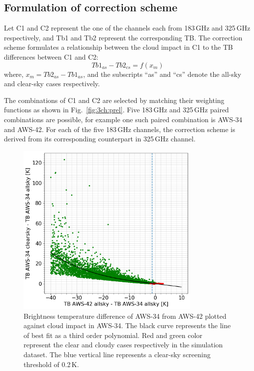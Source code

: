 \documentclass[12pt]{article}
\begin{document}
\subsection{Formulation of correction scheme}
\label{sec:correction:scheme}
%
Let C1 and C2 represent the one of the channels each from 183\,GHz and 325\,GHz
respectively, and Tb1 and Tb2 represent the corresponding TB. The correction
scheme formulates a relationship between the cloud impact in C1 to the TB
differences between C1 and C2:
\begin{equation}
Tb1_{as}-Tb2_{cs} = f(x_m)
\label{eq:TB:diff}
\end{equation}
where, $x_m = Tb2_{as} - Tb1_{as}$, and the subscripts ``as'' and ``cs'' denote the all-sky and clear-sky cases respectively.  

The combinations of C1 and C2 are selected by matching their weighting
functions as shown in Fig.~\ref{fig:3ch:prel}. Five 183\,GHz and 325\,GHz paired
combinations are possible, for example one such paired combination is AWS-34
and AWS-42. For each of the five 183\,GHz channels, the correction scheme is
derived from its corresponding counterpart in 325\,GHz channel.

\begin{figure}[!tb]
	\centering
	\includegraphics[height=85mm]{fit_AWS-34_AWS-42}\hspace{5mm}%
	\caption{Brightness temperature difference of AWS-34 from AWS-42 plotted
      against cloud impact in AWS-34. The black curve represents the line of
      best fit as a third order polynomial. Red and green color represent the
      clear and cloudy cases respectively in the simulation dataset. The blue
      vertical line represents a clear-sky screening threshold of 0.2\,K. }
	\label{fig:fit:c34-42}
\end{figure}
%
\end{document}
